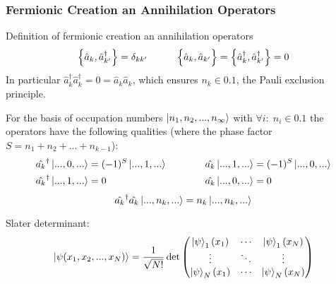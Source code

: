 		\subsubsection{Fermionic Creation an Annihilation Operators}
		\label{Sec:FermionicCreationAndAnnihilationOperators}
			Definition of fermionic creation an annihilation operators
			\begin{equation}
				\acomm{\hat{a}_k}{\hat{a}_{k'}^\dagger} = \delta_{kk'}
				\hsp
				\Big\lbrace\hat{a}_k,\hat{a}_{k'}\Big\rbrace = \acomm{\hat{a}_k^\dagger}{\hat{a}_{k'}^\dagger} = 0
			\end{equation}
			In particular $\hat{a}_k^\dagger \hat{a}_k^\dagger = 0 = \hat{a}_k \hat{a}_k$, which ensures $n_k\in\qty{0,1}$, \ie the Pauli exclusion principle.

			\noindent
			For the basis of occupation numbers $\Ket{n_1, n_2, ..., n_\infty}$ with $\forall i:\;n_i\in \qty{0,1}$ the operators have the following qualities (where the phase factor $S = n_1 + n_2 + ... + n_{k-1}$):
			\begin{equation}
				\begin{aligned}
					\hat{a_k}^\dagger \Ket{...,0,...} &= (-1)^S \Ket{...,1,...}
					&\hspace{30pt}
					\hat{a_k} \Ket{...,1,...} &= (-1)^S \Ket{...,0,...}
					\\
					\hat{a_k}^\dagger \Ket{...,1,...} &= 0
					&\hspace{30pt}
					\hat{a_k} \Ket{...,0,...} &= 0
				\end{aligned}
			\end{equation}
			\begin{equation}
				\hat{a_k}^\dagger \hat{a_k} \Ket{...,n_k,...} = n_k \Ket{...,n_k,...}				
			\end{equation}

			\noindent
			Slater determinant:
			\begin{equation}
				\Ket{\psi(x_1,x_2,...,x_N)} = \frac{1}{\sqrt{N!}} \det\left( \begin{matrix}
					\Ket{\psi}_1(x_1) & \dotsb & \Ket{\psi}_1(x_N) \\
					\vdots & \ddots & \vdots \\
					\Ket{\psi}_N(x_1) & \dotsb & \Ket{\psi}_N(x_N) \\
				\end{matrix} \right)
			\end{equation}


